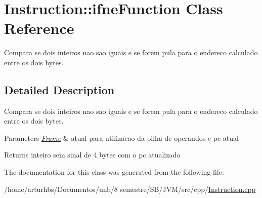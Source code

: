 \hypertarget{classInstruction_1_1ifneFunction}{}\section{Instruction\+:\+:ifne\+Function Class Reference}
\label{classInstruction_1_1ifneFunction}


Compara se dois inteiros nao sao iguais e se forem pula para o endereco calculado entre os dois bytes.  




\subsection{Detailed Description}
Compara se dois inteiros nao sao iguais e se forem pula para o endereco calculado entre os dois bytes. 


\begin{DoxyParams}{Parameters}
{\em \hyperlink{classFrame}{Frame}} & atual para utilizacao da pilha de operandos e pc atual \\
\hline
\end{DoxyParams}
\begin{DoxyReturn}{Returns}
inteiro sem sinal de 4 bytes com o pc atualizado 
\end{DoxyReturn}


The documentation for this class was generated from the following file\+:\begin{DoxyCompactItemize}
\item 
/home/arturhbs/\+Documentos/unb/8 semestre/\+S\+B/\+J\+V\+M/src/cpp/\hyperlink{Instruction_8cpp}{Instruction.\+cpp}\end{DoxyCompactItemize}
